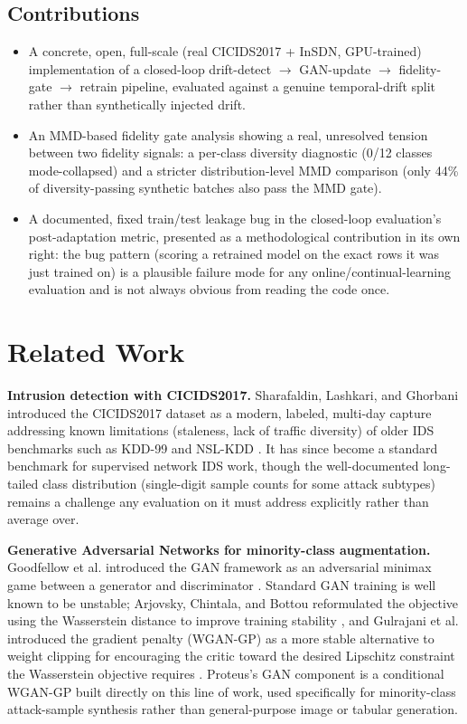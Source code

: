 \documentclass[conference]{IEEEtran}
\begin{document}
\subsection{Contributions}
\begin{itemize}
  \item A concrete, open, full-scale (real CICIDS2017 + InSDN, GPU-trained) implementation of a
    closed-loop drift-detect $\rightarrow$ GAN-update $\rightarrow$ fidelity-gate $\rightarrow$
    retrain pipeline, evaluated against a genuine temporal-drift split rather than synthetically
    injected drift.
  \item An MMD-based fidelity gate analysis showing a real, unresolved tension between two
    fidelity signals: a per-class diversity diagnostic (0/12 classes mode-collapsed) and a
    stricter distribution-level MMD comparison (only 44\% of diversity-passing synthetic batches
    also pass the MMD gate).
  \item A documented, fixed train/test leakage bug in the closed-loop evaluation's post-adaptation
    metric, presented as a methodological contribution in its own right: the bug pattern (scoring
    a retrained model on the exact rows it was just trained on) is a plausible failure mode for
    any online/continual-learning evaluation and is not always obvious from reading the code once.
\end{itemize}

\section{Related Work}

\textbf{Intrusion detection with CICIDS2017.} Sharafaldin, Lashkari, and Ghorbani introduced the
CICIDS2017 dataset as a modern, labeled, multi-day capture addressing known limitations
(staleness, lack of traffic diversity) of older IDS benchmarks such as KDD-99 and NSL-KDD
\cite{sharafaldin2018}. It has since become a standard benchmark for supervised network IDS
work, though the well-documented long-tailed class distribution (single-digit sample counts for
some attack subtypes) remains a challenge any evaluation on it must address explicitly rather
than average over.

\textbf{Generative Adversarial Networks for minority-class augmentation.} Goodfellow et al.
introduced the GAN framework as an adversarial minimax game between a generator and
discriminator \cite{goodfellow2014}. Standard GAN training is well known to be unstable;
Arjovsky, Chintala, and Bottou reformulated the objective using the Wasserstein distance to
improve training stability \cite{arjovsky2017}, and Gulrajani et al. introduced the gradient
penalty (WGAN-GP) as a more stable alternative to weight clipping for encouraging the critic toward the desired Lipschitz
constraint the Wasserstein objective requires \cite{gulrajani2017}. Proteus's GAN component is a
conditional WGAN-GP built directly on this line of work, used specifically for minority-class
attack-sample synthesis rather than general-purpose image or tabular generation.
\end{document}
